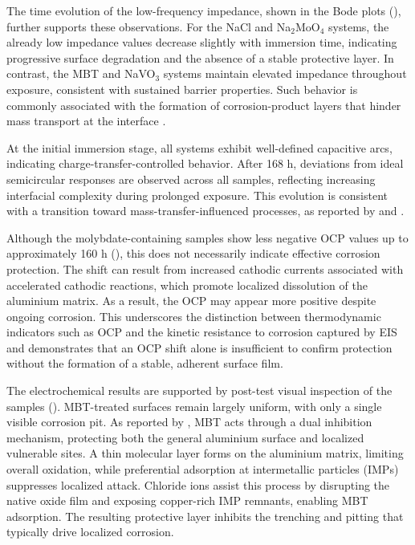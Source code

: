 \documentclass[11pt,twoside,a4paper]{report}
\begin{document}
The time evolution of the low-frequency impedance, shown in the Bode plots (), further supports these observations. For the NaCl and Na$_2$MoO$_4$ systems, the already low impedance values decrease slightly with immersion time, indicating progressive surface degradation and the absence of a stable protective layer. In contrast, the MBT and NaVO$_3$ systems maintain elevated impedance throughout exposure, consistent with sustained barrier properties. Such behavior is commonly associated with the formation of corrosion-product layers that hinder mass transport at the interface \cite{Tedim2014}.

At the initial immersion stage, all systems exhibit well-defined capacitive arcs, indicating charge-transfer-controlled behavior. After 168 h, deviations from ideal semicircular responses are observed across all samples, reflecting increasing interfacial complexity during prolonged exposure. This evolution is consistent with a transition toward mass-transfer-influenced processes, as reported by \citet{He2020} and \citet{Lazanas2023}.

Although the molybdate-containing samples show less negative OCP values up to approximately 160 h (), this does not necessarily indicate effective corrosion protection. The shift can result from increased cathodic currents associated with accelerated cathodic reactions, which promote localized dissolution of the aluminium matrix. As a result, the OCP may appear more positive despite ongoing corrosion. This underscores the distinction between thermodynamic indicators such as OCP and the kinetic resistance to corrosion captured by EIS and demonstrates that an OCP shift alone is insufficient to confirm protection without the formation of a stable, adherent surface film.

The electrochemical results are supported by post-test visual inspection of the samples (). MBT-treated surfaces remain largely uniform, with only a single visible corrosion pit. As reported by \citet{Garg2025}, MBT acts through a dual inhibition mechanism, protecting both the general aluminium surface and localized vulnerable sites. A thin molecular layer forms on the aluminium matrix, limiting overall oxidation, while preferential adsorption at intermetallic particles (IMPs) suppresses localized attack. Chloride ions assist this process by disrupting the native oxide film and exposing copper-rich IMP remnants, enabling MBT adsorption. The resulting protective layer inhibits the trenching and pitting that typically drive localized corrosion.
\end{document}
